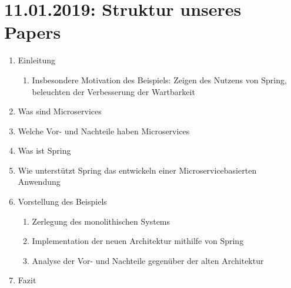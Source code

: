 \documentclass{article}
\begin{document}
\section{11.01.2019: Struktur unseres Papers}

\begin{enumerate}
    \item Einleitung
    \begin{enumerate}
        \item Insbesondere Motivation des Beispiels: Zeigen des Nutzens von Spring, beleuchten der Verbesserung der Wartbarkeit
    \end{enumerate}
    \item Was sind Microservices
    \item Welche Vor- und Nachteile haben Microservices
    \item Was ist Spring
    \item Wie unterstützt Spring das entwickeln einer Microservicebasierten Anwendung
    \item Vorstellung des Beispiels
    \begin{enumerate}
        \item Zerlegung des monolithischen Systems
        \item Implementation der neuen Architektur mithilfe von Spring
        \item Analyse der Vor- und Nachteile gegenüber der alten Architektur
    \end{enumerate}
    \item Fazit
\end{enumerate}
\end{document}
